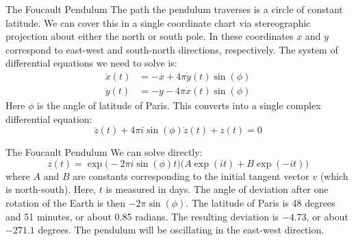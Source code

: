 \documentclass{beamer}
\begin{document}
    \begin{frame}{The Foucault Pendulum}
        The path the pendulum traverses is a circle of constant latitude.
        We can cover this in a single coordinate chart via stereographic
        projection about either the north or south pole. In these coordinates
        $x$ and $y$ correspond to east-west and south-north directions,
        respectively. The system of differential equations we need to solve is:
        \begin{align}
            \ddot{x}(t)&=-x+4\pi\dot{y}(t)\sin(\phi)\\
            \ddot{y}(t)&=-y-4\pi\dot{x}(t)\sin(\phi)
        \end{align}
        Here $\phi$ is the angle of latitude of Paris. This converts into a
        single complex differential equation:
        \begin{equation}
            \ddot{z}(t)+4\pi{i}\sin(\phi)\dot{z}(t)+z(t)=0
        \end{equation}
    \end{frame}
    \begin{frame}{The Foucault Pendulum}
        We can solve directly:
        \begin{equation}
            z(t)=\exp\Big(-2\pi{i}\sin(\phi)t\Big)\Big(A\exp(it)+B\exp(-it)\Big)
        \end{equation}
        where $A$ and $B$ are constants corresponding to the initial tangent
        vector $v$ (which is north-south). Here, $t$ is measured in days. The
        angle of deviation after one rotation of the Earth is then
        $-2\pi\sin(\phi)$. The latitude of Paris is 48 degrees and 51 minutes,
        or about 0.85 radians. The resulting deviation is
        $-4.73$, or about $-271.1$ degrees. The pendulum will be oscillating
        in the east-west direction.
    \end{frame}
\end{document}
